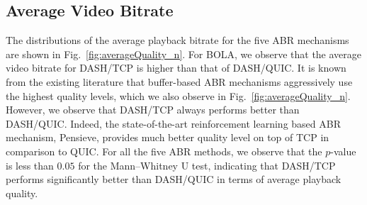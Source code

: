 \subsection{Average Video Bitrate}
The distributions of the average playback bitrate for the five ABR mechanisms are shown in Fig.~\ref{fig:averageQuality_n}. For BOLA, we observe that the average video bitrate for DASH/TCP is higher than that of DASH/QUIC. It is known from the existing literature that buffer-based ABR mechanisms aggressively use the highest quality levels, which we also observe in Fig.~\ref{fig:averageQuality_n}. However, we observe that DASH/TCP always performs better than DASH/QUIC. Indeed, the state-of-the-art reinforcement learning based ABR mechanism, Pensieve, provides much better quality level on top of TCP in comparison to QUIC. For all the five ABR methods, we observe that the $p$-value is less than $0.05$ for the Mann–Whitney U test, indicating that DASH/TCP performs significantly better than DASH/QUIC in terms of average playback quality.


